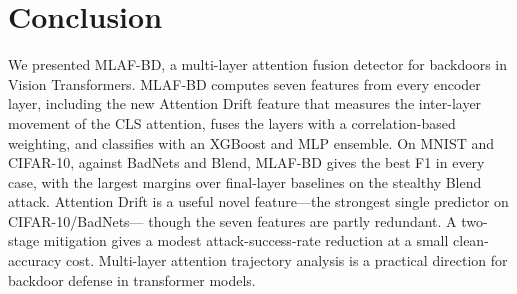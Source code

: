 \documentclass[journal]{IEEEtran}
\begin{document}
\section{Conclusion}
We presented MLAF-BD, a multi-layer attention fusion detector for backdoors in
Vision Transformers. MLAF-BD computes seven features from every encoder layer,
including the new Attention Drift feature that measures the inter-layer movement
of the CLS attention, fuses the layers with a correlation-based weighting, and
classifies with an XGBoost and MLP ensemble. On MNIST and CIFAR-10, against
BadNets and Blend, MLAF-BD gives the best F1 in every case, with the largest
margins over final-layer baselines on the stealthy Blend attack. Attention Drift
is a useful novel feature---the strongest single predictor on CIFAR-10/BadNets---
though the seven features are partly redundant. A two-stage mitigation gives a
modest attack-success-rate reduction at a small clean-accuracy cost. Multi-layer
attention trajectory analysis is a practical direction for backdoor defense in
transformer models.



\end{document}
